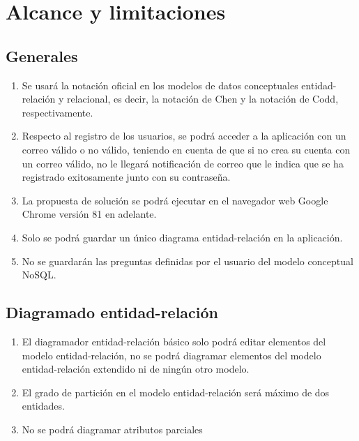 \section{Alcance y limitaciones}\label{sec:alcance}
\subsection*{Generales}
\begin{enumerate}
    \item Se usará la notación oficial en los modelos de datos conceptuales entidad-relación y relacional, es decir, la notación de Chen y la notación de Codd, respectivamente.
    \item Respecto al registro de los usuarios, se podrá acceder a la aplicación con un correo válido o no válido, teniendo en cuenta de que si no crea su cuenta con un correo válido, no le llegará notificación de correo que le indica que se ha registrado exitosamente junto con su contraseña.
    \item La propuesta de solución se podrá ejecutar en el navegador web Google Chrome versión 81 en adelante.
    \item Solo se podrá guardar un único diagrama entidad-relación en la aplicación.
    \item No se guardarán las preguntas definidas por el usuario del modelo conceptual NoSQL.
    
\end{enumerate}

\subsection*{Diagramado entidad-relación}
\begin{enumerate}
    \item El diagramador entidad-relación básico solo podrá editar elementos del modelo entidad-relación, no se podrá diagramar elementos del modelo entidad-relación extendido ni de ningún otro modelo.
    \item El grado de partición en el modelo entidad-relación será máximo de dos entidades.
    \item No se podrá diagramar atributos parciales
\end{enumerate}

